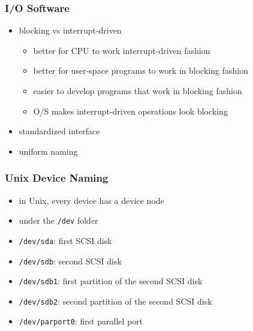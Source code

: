 \documentclass[dvipsnames]{beamer}
\begin{document}
\begin{frame}
  \frametitle{I/O Software}

  \begin{itemize}
    \item blocking vs interrupt-driven
    \begin{itemize}
      \item better for CPU to work interrupt-driven fashion
      \item better for user-space programs to work in blocking fashion
      \item easier to develop programs that work in blocking fashion
      \item O/S makes interrupt-driven operations look blocking
    \end{itemize}

    \pause
    \medskip
    \item standardized interface
    \item uniform naming
  \end{itemize}
\end{frame}

\begin{frame}
  \frametitle{Unix Device Naming}

  \begin{itemize}
    \item in Unix, every device has a \alert{device node}
    \item under the \texttt{/dev} folder

    \pause
    \medskip
    \item \texttt{/dev/sda}: first SCSI disk
    \item \texttt{/dev/sdb}: second SCSI disk
    \item \texttt{/dev/sdb1}: first partition of the second SCSI disk
    \item \texttt{/dev/sdb2}: second partition of the second SCSI disk

    \pause
    \medskip
    \item \texttt{/dev/parport0}: first parallel port
  \end{itemize}
\end{frame}
\end{document}
